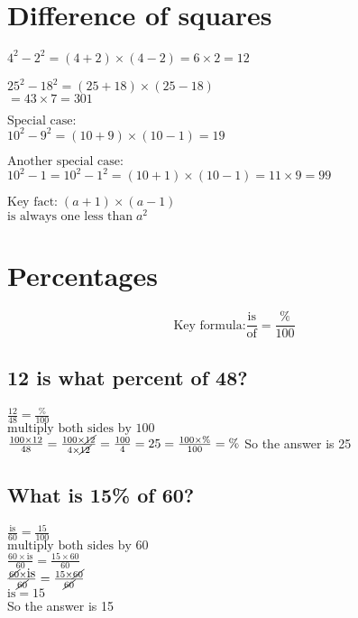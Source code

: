 \documentclass[fullpage,twocolumn]{article}
\begin{document}
\section{Difference of squares}
${4^2 - 2^2 = (4 + 2) \times (4 - 2) =  6 \times 2 = 12  }$

$25^2 - 18^2 = (25+18)\times (25 - 18)$ \\
$ = 43\times 7 = 301$

$\mbox{Special case:}\;$\\
$10^2 - 9^2 = (10+9) \times (10-1) = 19$

$\mbox{Another special case:}\;$\\
$10^2 - 1 = 10^2 - 1^2 = (10+1) \times (10-1) = 11 \times 9 = 99$

$\mbox{Key fact:}\;   (a+1) \times (a-1) \;$ \\
$\mbox{is always one less than} \; a^2$

\section{Percentages}

\[
\mbox{Key formula:} \frac{\mbox{is}}{\mbox{of}} = \frac{\%}{100}
\]

\subsection{12 is what percent of 48?}

${\frac{12}{48} = \frac{\%}{100}} $\\
${\mbox{multiply both sides by 100}} $\\
${\frac{100 \times 12 }{48} = \frac{100 \times \cancel{12}}{4 \times \cancel{12}} = \frac{100}{4} = 25 = \frac{100 \times \% }{100} = \%}$
So the answer is 25

\subsection{What is 15\% of 60?}

${\frac{\mbox{is}}{60} = \frac{15}{100} }$ \\
${\mbox{multiply both sides by 60} }$ \\
${\frac{60 \times \mbox{is} }{60 } = \frac{ 15  \times 60}{60}}$ \\
${\frac{\cancel{60} \times \mbox{is} }{\cancel{60} } = \frac{ 15  \times \cancel{60}}{\cancel{60}}}$ \\
 ${\mbox{is} = 15} $ \\
So the answer is 15
\end{document}
